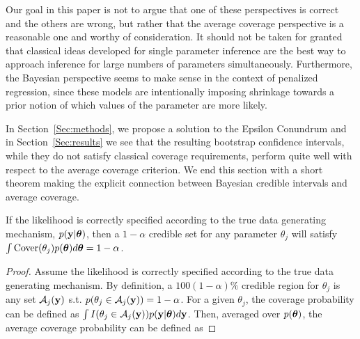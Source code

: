 Our goal in this paper is not to argue that one of these perspectives is correct and the others are wrong, but rather that the average coverage perspective is a reasonable one and worthy of consideration. It should not be taken for granted that classical ideas developed for single parameter inference are the best way to approach inference for large numbers of parameters simultaneously. Furthermore, the Bayesian perspective seems to make sense in the context of penalized regression, since these models are intentionally imposing shrinkage towards a prior notion of which values of the parameter are more likely.

In Section~\ref{Sec:methods}, we propose a solution to the Epsilon Conundrum and in Section~\ref{Sec:results} we see that the resulting bootstrap confidence intervals, while they do not satisfy classical coverage requirements, perform quite well with respect to the average coverage criterion. We end this section with a short theorem making the explicit connection between Bayesian credible intervals and average coverage.


 

\begin{thm}
  \label{Thm:bcc}
  If the likelihood is correctly specified according to the true data generating mechanism, $p(\mathbf{y} | \boldsymbol{\theta})$, then a $1-\alpha$ credible set for any parameter $\theta_j$ will satisfy $\int \textrm{Cover}(\theta_j)p(\boldsymbol{\theta}) d\boldsymbol{\theta} = 1 - \alpha$.
\end{thm}

\begin{proof}
Assume the likelihood is correctly specified according to the true data generating mechanism. By definition, a $100(1-\alpha)\%$ credible region for $\theta_j$ is any set $\mathcal{A}_j(\mathbf{y})$ s.t. $p(\theta_j \in \mathcal{A}_j(\mathbf{y})) = 1 - \alpha$. For a given $\theta_j$, the coverage probability can be defined as $\int I(\theta_j \in \mathcal{A}_j(\mathbf{y})) p(\mathbf{y} | \boldsymbol{\theta})d\mathbf{y}$. Then, averaged over $p(\boldsymbol{\theta})$, the average coverage probability can be defined as


\end{proof}


